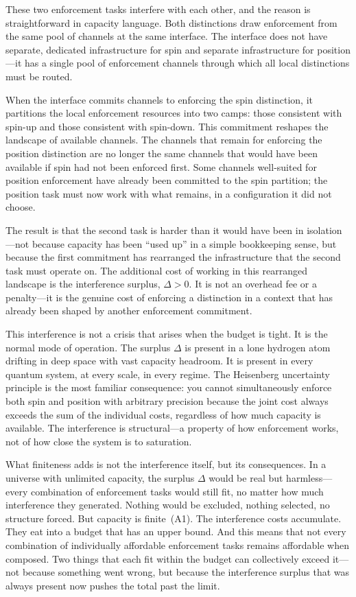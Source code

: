 \documentclass[11pt]{article}
\begin{document}
These two enforcement tasks interfere with each other, and the reason is straightforward in capacity language.  Both distinctions draw enforcement from the same pool of channels at the same interface.  The interface does not have separate, dedicated infrastructure for spin and separate infrastructure for position---it has a single pool of enforcement channels through which all local distinctions must be routed.

When the interface commits channels to enforcing the spin distinction, it partitions the local enforcement resources into two camps: those consistent with spin-up and those consistent with spin-down.  This commitment reshapes the landscape of available channels.  The channels that remain for enforcing the position distinction are no longer the same channels that would have been available if spin had not been enforced first.  Some channels well-suited for position enforcement have already been committed to the spin partition; the position task must now work with what remains, in a configuration it did not choose.

The result is that the second task is harder than it would have been in isolation---not because capacity has been ``used up'' in a simple bookkeeping sense, but because the first commitment has rearranged the infrastructure that the second task must operate on.  The additional cost of working in this rearranged landscape is the interference surplus, $\Delta > 0$.  It is not an overhead fee or a penalty---it is the genuine cost of enforcing a distinction in a context that has already been shaped by another enforcement commitment.

This interference is not a crisis that arises when the budget is tight.  It is the normal mode of operation.  The surplus $\Delta$ is present in a lone hydrogen atom drifting in deep space with vast capacity headroom.  It is present in every quantum system, at every scale, in every regime.  The Heisenberg uncertainty principle is the most familiar consequence: you cannot simultaneously enforce both spin and position with arbitrary precision because the joint cost always exceeds the sum of the individual costs, regardless of how much capacity is available.  The interference is structural---a property of how enforcement works, not of how close the system is to saturation.

What finiteness adds is not the interference itself, but its consequences.  In a universe with unlimited capacity, the surplus $\Delta$ would be real but harmless---every combination of enforcement tasks would still fit, no matter how much interference they generated.  Nothing would be excluded, nothing selected, no structure forced.  But capacity is finite~(A1).  The interference costs accumulate.  They eat into a budget that has an upper bound.  And this means that not every combination of individually affordable enforcement tasks remains affordable when composed.  Two things that each fit within the budget can collectively exceed it---not because something went wrong, but because the interference surplus that was always present now pushes the total past the limit.
\end{document}
